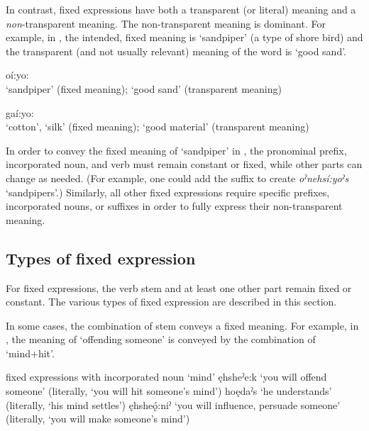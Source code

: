 In contrast, fixed expressions have both a transparent (or literal) meaning and a \emph{non}-transparent meaning. The non-trans\-parent meaning is dominant. For example, in , the intended, fixed meaning is ‘sandpiper’ (a type of shore bird) and the transparent (and not usually relevant) meaning of the word is ‘good sand’. 

\largerpage
\ea\label{ex:verbex26} 
\ea oí:yo: \\\label{ex:verbex26a} 
\glt ‘sandpiper’ (fixed meaning); ‘good sand’ (transparent meaning)

\ex gaí:yo: \\\label{ex:verbex26b} 
\glt ‘cotton’, ‘silk’ (fixed meaning); ‘good material’ (transparent meaning)
\z
\z

In order to convey the fixed meaning of ‘sandpiper’ in , the pronominal prefix, incorporated noun, and verb must remain constant or fixed, while other parts can change as needed. (For example, one could add the  {\plural} suffix to create \textit{oˀnehsí:yoˀs} ‘sandpipers’.) Similarly, all other fixed expressions require specific prefixes, incorporated nouns, or suffixes in order to fully express their non-transparent meaning.


\largerpage
\subsection{Types of fixed expression} \label{Types of fixed expression}
For fixed expressions, the verb stem and at least one other part remain fixed or constant. The various types of fixed expression are described in this section.

In some cases, the combination of  stem conveys a fixed meaning. For example, in , the meaning of ‘offending someone’ is conveyed by the combination of  ‘mind+hit’. 

\ea\label{ex:verbex28} fixed expressions with incorporated noun  ‘mind’
\ea\label{ex:verbex28a} ęhsheˀe:k ‘you will offend someone’ (literally, ‘you will hit someone’s mind’) 
\ex\label{ex:verbex28b} hoędaˀs ‘he understands’ (literally, ‘his mind settles’)
\ex\label{ex:verbex28c} ęhsheǫ́:niˀ ‘you will influence, persuade someone’ (literally, ‘you will make someone’s mind’)
\z
\z

